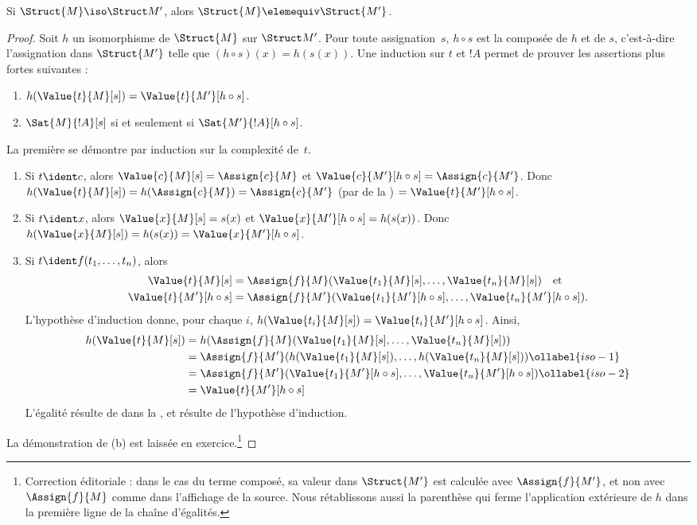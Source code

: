 \documentclass[../../../include/open-logic-section]{subfiles}
\begin{document}
\begin{thm}
Si $\Struct{M} \iso \Struct M'$, alors $\Struct{M} \elemequiv
\Struct{M'}$.
\end{thm}

\begin{proof}
Soit $h$ un isomorphisme de $\Struct{M}$ sur $\Struct M'$. Pour toute
assignation~$s$, $h \circ s$ est la composée de $h$ et de $s$,
c'est-à-dire l'assignation dans $\Struct{M'}$ telle que
$(h \circ s)(x) = h(s(x))$. Une induction sur $t$ et $!A$ permet de
prouver les assertions plus fortes suivantes :
\begin{enumerate}
  \item[a.] $h(\Value{t}{M}[s]) = \Value{t}{M'}[h\circ s]$.
  \item[b.] $\Sat{M}{!A}[s]$ si et seulement si $\Sat{M'}{!A}[h \circ s]$.
\end{enumerate}
La première se démontre par induction sur la complexité de~$t$.
\begin{enumerate}
\item Si $t \ident c$, alors $\Value{c}{M}[s] = \Assign{c}{M}$ et
  $\Value{c}{M'}[h \circ s] = \Assign{c}{M'}$. Donc
  $h(\Value{t}{M}[s]) = h(\Assign{c}{M}) = \Assign{c}{M'}$ (par
   de la ) $=
  \Value{t}{M'}[h \circ s]$.
\item Si $t \ident x$, alors $\Value{x}{M}[s] = s(x)$ et
  $\Value{x}{M'}[h \circ s] = h(s(x))$. Donc
  $h(\Value{x}{M}[s]) = h(s(x)) = \Value{x}{M'}[h \circ s]$.
\item Si $t \ident f(t_1, \dots, t_n)$, alors
  \begin{align*}
    \Value{t}{M}[s] & = \Assign{f}{M}(\Value{t_1}{M}[s], \dots, \Value{t_n}{M}[s]) \quad\text{et}\\
  \Value{t}{M'}[h \circ s] & = \Assign{f}{M'}(\Value{t_1}{M'}[h \circ
    s], \dots, \Value{t_n}{M'}[h \circ s]).
  \end{align*}
  L'hypothèse d'induction donne, pour chaque $i$,
  $h(\Value{t_i}{M}[s]) = \Value{t_i}{M'}[h\circ s]$. Ainsi,
  \begin{align}
    h(\Value{t}{M}[s])
    & = h(\Assign{f}{M}(\Value{t_1}{M}[s], \dots, \Value{t_n}{M}[s])) \notag\\
    & = \Assign{f}{M'}(h(\Value{t_1}{M}[s]), \dots,
    h(\Value{t_n}{M}[s])) \ollabel{iso-1}\\
    & = \Assign{f}{M'}(\Value{t_1}{M'}[h \circ s], \dots,
    \Value{t_n}{M'}[h \circ s]) \ollabel{iso-2}\\
    & = \Value{t}{M'}[h\circ s] \notag
  \end{align}
  L'égalité  résulte de 
  dans la , et  résulte de
  l'hypothèse d'induction.
\end{enumerate}
La démonstration de (b) est laissée en exercice.\footnote{Correction éditoriale : dans le cas du terme composé, sa valeur dans $\Struct{M'}$ est calculée avec $\Assign{f}{M'}$, et non avec $\Assign{f}{M}$ comme dans l'affichage de la source. Nous rétablissons aussi la parenthèse qui ferme l'application extérieure de $h$ dans la première ligne de la chaîne d'égalités.}


\end{proof}
\end{document}
